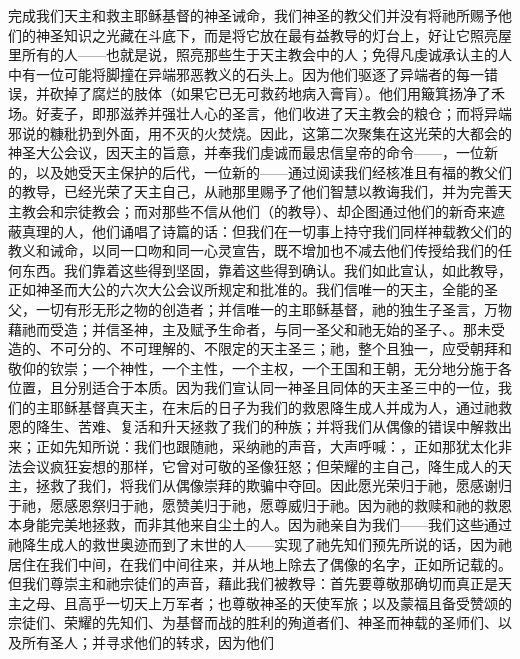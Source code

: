 完成我们天主和救主耶稣基督的神圣诫命，我们神圣的教父们并没有将祂所赐予他们的神圣知识之光藏在斗底下，而是将它放在最有益教导的灯台上，好让它照亮屋里所有的人——也就是说，照亮那些生于天主教会中的人；免得凡虔诚承认主的人中有一位可能将脚撞在异端邪恶教义的石头上。因为他们驱逐了异端者的每一错误，并砍掉了腐烂的肢体（如果它已无可救药地病入膏肓）。他们用簸箕扬净了禾场。好麦子，即那滋养并强壮人心的圣言，他们收进了天主教会的粮仓；而将异端邪说的糠秕扔到外面，用不灭的火焚烧。因此，这第二次聚集在这光荣的大都会的神圣大公会议，因天主的旨意，并奉我们虔诚而最忠信皇帝的命令——，一位新的，以及她受天主保护的后代，一位新的——通过阅读我们经核准且有福的教父们的教导，已经光荣了天主自己，从祂那里赐予了他们智慧以教诲我们，并为完善天主教会和宗徒教会；而对那些不信从他们（的教导）、却企图通过他们的新奇来遮蔽真理的人，他们诵唱了诗篇的话：但我们在一切事上持守我们同样神载教父们的教义和诫命，以同一口吻和同一心灵宣告，既不增加也不减去他们传授给我们的任何东西。我们靠着这些得到坚固，靠着这些得到确认。我们如此宣认，如此教导，正如神圣而大公的六次大公会议所规定和批准的。我们信唯一的天主，全能的圣父，一切有形无形之物的创造者；并信唯一的主耶稣基督，祂的独生子圣言，万物藉祂而受造；并信圣神，主及赋予生命者，与同一圣父和祂无始的圣子、。那未受造的、不可分的、不可理解的、不限定的天主圣三；祂，整个且独一，应受朝拜和敬仰的钦崇；一个神性，一个主性，一个主权，一个王国和王朝，无分地分施于各位置，且分别适合于本质。因为我们宣认同一神圣且同体的天主圣三中的一位，我们的主耶稣基督真天主，在末后的日子为我们的救恩降生成人并成为人，通过祂救恩的降生、苦难、复活和升天拯救了我们的种族；并将我们从偶像的错误中解救出来；正如先知所说：我们也跟随祂，采纳祂的声音，大声呼喊：，正如那犹太化非法会议疯狂妄想的那样，它曾对可敬的圣像狂怒；但荣耀的主自己，降生成人的天主，拯救了我们，将我们从偶像崇拜的欺骗中夺回。因此愿光荣归于祂，愿感谢归于祂，愿感恩祭归于祂，愿赞美归于祂，愿尊威归于祂。因为祂的救赎和祂的救恩本身能完美地拯救，而非其他来自尘土的人。因为祂亲自为我们——我们这些通过祂降生成人的救世奥迹而到了末世的人——实现了祂先知们预先所说的话，因为祂居住在我们中间，在我们中间往来，并从地上除去了偶像的名字，正如所记载的。但我们尊崇主和祂宗徒们的声音，藉此我们被教导：首先要尊敬那确切而真正是天主之母、且高乎一切天上万军者；也尊敬神圣的天使军旅；以及蒙福且备受赞颂的宗徒们、荣耀的先知们、为基督而战的胜利的殉道者们、神圣而神载的圣师们、以及所有圣人；并寻求他们的转求，因为他们